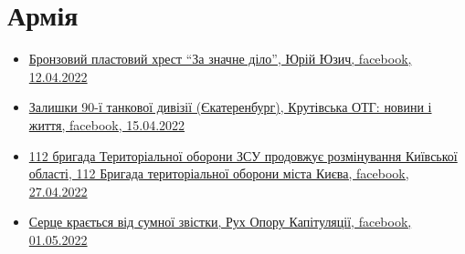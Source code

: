  
 
 
 
 
\section{Армія}



\begin{itemize} %

\item \hyperlink{12_04_2022.fb.juzych_jurij.1.plast_krest_nagrada}{%
Бронзовий пластовий хрест \enquote{За значне діло}, Юрій Юзич, facebook, 12.04.2022%
}

\item \hyperlink{15_04_2022.fb.krutivska_otg.1.zalyshky_divizii_ekaterinburg}{%
Залишки 90-ї танкової дивізії (Єкатеренбург), Крутівська ОТГ: новини і життя, %
facebook, 15.04.2022%
}

\item \hyperlink{27_04_2022.fb.teroborona_ua.kiev.112.br.1.rozminuvannja_kiev_obl}{%
112 бригада Територіальної оборони ЗСУ продовжує розмінування Київської області, %
112 Бригада територіальної оборони міста Києва, facebook, 27.04.2022%
}

\item \hyperlink{01_05_2022.fb.fb_group.ruh_oporu_kapituljacii.1.smert_ruslan_borovik}{%
Серце крається від сумної звістки, Рух Опору Капітуляції, facebook, 01.05.2022%
}
\end{itemize} %
